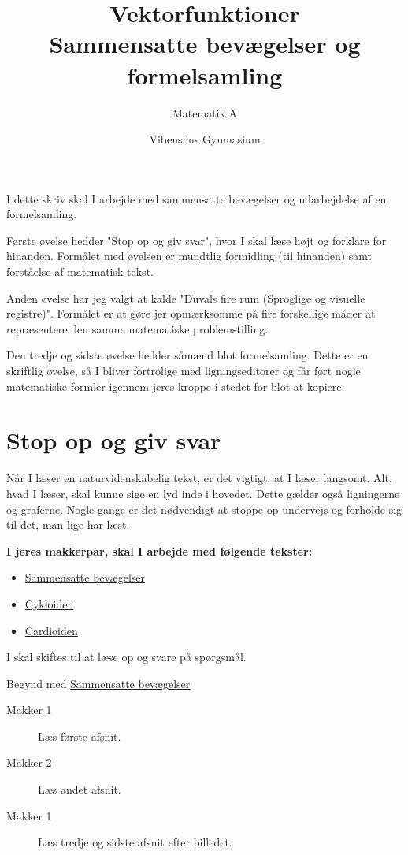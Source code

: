 \documentclass[a4paper, 12pt]{article}
\author{Matematik A}
\date{Vibenshus Gymnasium}
\title{Vektorfunktioner\\\medskip
\large Sammensatte bevægelser og formelsamling}
\begin{document}
\maketitle
I dette skriv skal I arbejde med sammensatte bevægelser og udarbejdelse af en formelsamling. 

Første øvelse hedder "Stop op og giv svar", hvor I skal læse højt og forklare for hinanden. Formålet med øvelsen er mundtlig formidling (til hinanden) samt forståelse af matematisk tekst. 

Anden øvelse har jeg valgt at kalde "Duvals fire rum (Sproglige og visuelle registre)". Formålet er at gøre jer opmærksomme på fire forskellige måder at repræsentere den samme matematiske problemstilling. 

Den tredje og sidste øvelse hedder såmænd blot formelsamling. Dette er en skriftlig øvelse, så I bliver fortrolige med ligningseditorer og får ført nogle matematiske formler igennem jeres kroppe i stedet for blot at kopiere.

\section*{Stop op og giv svar}
\label{sec:org3706bb2}

Når I læser en naturvidenskabelig tekst, er det vigtigt, at I læser langsomt. Alt, hvad I læser, skal kunne sige en lyd inde i hovedet. Dette gælder også ligningerne og graferne. Nogle gange er det nødvendigt at stoppe op undervejs og forholde sig til det, man lige har læst.

\textbf{I jeres makkerpar, skal I arbejde med følgende tekster:}

\begin{itemize}
\item \href{https://mathtxa.systime.dk/?id=365}{Sammensatte bevægelser}
\item \href{https://mathtxa.systime.dk/?id=p366}{Cykloiden}
\item \href{https://mathtxa.systime.dk/?id=p367}{Cardioiden}
\end{itemize}

I skal skiftes til at læse op og svare på spørgsmål.

Begynd med \href{https://mathtxa.systime.dk/?id=365}{Sammensatte bevægelser}

\begin{description}
\item[{Makker 1}] Læs første afsnit.

\item[{Makker 2}] Læs andet afsnit.

\item[{Makker 1}] Læs tredje og sidste afsnit efter billedet.
\end{description}
\end{document}
